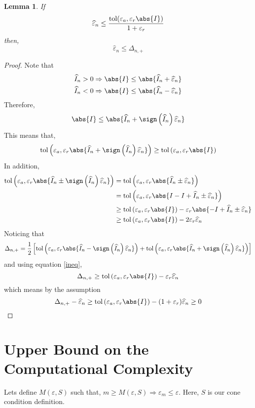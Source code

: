 \documentclass[]{elsarticle}
\newtheorem{lem}{Lemma}
\theoremstyle{definition}
\newcommand{\tol}{\text{tol}}
\begin{document}
\begin{lem}\label{second}
If
\[
\widehat{\varepsilon}_n\leq \frac{\tol(\varepsilon_a,\varepsilon_r\abs{I})}{1+\varepsilon_r}
\]
then,
\[
\widehat{\varepsilon}_n\leq \Delta_{n,+}
\]
\end{lem}
\begin{proof}
Note that
\begin{align*}
&\widehat{I}_n>0\Rightarrow\abs{I}\leq \abs{\widehat{I}_n+\widehat{\varepsilon}_n}\\
&\widehat{I}_n<0\Rightarrow\abs{I}\leq \abs{\widehat{I}_n-\widehat{\varepsilon}_n}
\end{align*}
Therefore, 
\[
\abs{I}\leq \abs{\widehat{I}_n+\sign\left(\widehat{I}_n\right)\widehat{\varepsilon}_n}
\]
This means that,
\begin{equation}\label{ineq}
\tol\left(\varepsilon_a,\varepsilon_r\abs{\widehat{I}_n+\sign\left(\widehat{I}_n\right)\widehat{\varepsilon}_n}\right)\geq \tol\left(\varepsilon_a,\varepsilon_r\abs{I}\right)
\end{equation}
In addition,
\begin{align}
\tol\left(\varepsilon_a,\varepsilon_r\abs{\widehat{I}_n\pm\sign\left(\widehat{I}_n\right)\widehat{\varepsilon}_n}\right)&=\tol\left(\varepsilon_a,\varepsilon_r\abs{\widehat{I}_n\pm\widehat{\varepsilon}_n}\right)\\
& =\tol\left(\varepsilon_a,\varepsilon_r\abs{I-I+\widehat{I}_n\pm\widehat{\varepsilon}_n}\right)\\
& \geq \tol\left(\varepsilon_a,\varepsilon_r\abs{I}\right)-\varepsilon_r\abs{-I+\widehat{I}_n\pm\widehat{\varepsilon}_n} \\
& \geq \tol\left(\varepsilon_a,\varepsilon_r\abs{I}\right)-2\varepsilon_r\widehat{\varepsilon}_n
\end{align}
Noticing that
\[
\Delta_{n,+}=\frac 1 2 \left[ \tol\left(\varepsilon_a,\varepsilon_r\abs{\widehat{I}_n-\sign\left(\widehat{I}_n\right)\widehat{\varepsilon}_n}\right) + \tol\left(\varepsilon_a,\varepsilon_r\abs{\widehat{I}_n+\sign\left(\widehat{I}_n\right)\widehat{\varepsilon}_n}\right) \right]
\]
and using equation \eqref{ineq},
\[
\Delta_{n,+}\geq \tol\left(\varepsilon_a,\varepsilon_r\abs{I}\right)-\varepsilon_r\widehat{\varepsilon}_n
\]
which means by the assumption
\[
\Delta_{n,+} - \widehat{\varepsilon}_n \geq \tol\left(\varepsilon_a,\varepsilon_r\abs{I}\right)-(1+\varepsilon_r)\widehat{\varepsilon}_n\geq 0
\]
\end{proof}

\section{Upper Bound on the Computational Complexity}
Lets define $M(\varepsilon,S)$ such that, $m\geq M(\varepsilon,S)\Rightarrow {\varepsilon}_m\leq \varepsilon$. Here, $S$ is our cone condition definition.
\end{document}
